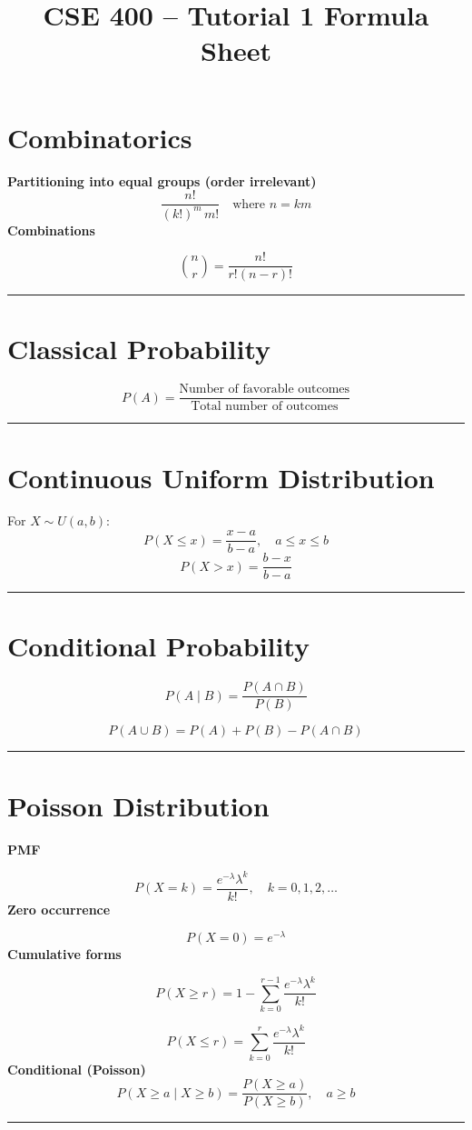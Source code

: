 \documentclass[12pt]{article}
\title{CSE 400 -- Tutorial 1 Formula Sheet}
\date{}
\begin{document}
\maketitle

\section*{Combinatorics}

\textbf{Partitioning into equal groups (order irrelevant)}
\[
\frac{n!}{(k!)^m \, m!} \quad \text{where } n = km
\]
\textbf{Combinations}

\[
\binom{n}{r} = \frac{n!}{r!(n-r)!}
\]
\noindent\rule{\textwidth}{0.4pt}
\section*{Classical Probability}

\[
P(A) = \frac{\text{Number of favorable outcomes}}{\text{Total number of outcomes}}
\]
\noindent\rule{\textwidth}{0.4pt}
\section*{Continuous Uniform Distribution}

For $X \sim U(a,b)$:
\[
P(X \le x) = \frac{x-a}{b-a}, \quad a \le x \le b
\]
\[
P(X > x) = \frac{b-x}{b-a}
\]
\noindent\rule{\textwidth}{0.4pt}
\section*{Conditional Probability}

\[
P(A \mid B) = \frac{P(A \cap B)}{P(B)}
\]

\[
P(A \cup B) = P(A) + P(B) - P(A \cap B)
\]
\noindent\rule{\textwidth}{0.4pt}
\section*{Poisson Distribution}

\textbf{PMF}

\[
P(X = k) = \frac{e^{-\lambda} \lambda^k}{k!}, \quad k = 0,1,2,\dots
\]
\textbf{Zero occurrence}

\[
P(X = 0) = e^{-\lambda}
\]
\textbf{Cumulative forms}

\[
P(X \ge r) = 1 - \sum_{k=0}^{r-1} \frac{e^{-\lambda}\lambda^k}{k!}
\]

\[
P(X \le r) = \sum_{k=0}^{r} \frac{e^{-\lambda}\lambda^k}{k!}
\]
\textbf{Conditional (Poisson)}
\[
P(X \ge a \mid X \ge b) = \frac{P(X \ge a)}{P(X \ge b)}, \quad a \ge b
\]
\noindent\rule{\textwidth}{0.4pt}
\end{document}
